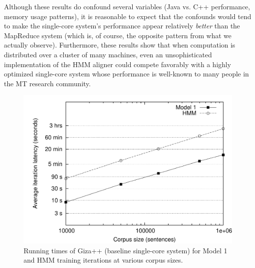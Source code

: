 Although these results do confound several variables (Java vs. C++
performance, memory usage patterns), it is reasonable to expect that
the confounds would tend to make the single-core system's performance
appear relatively \emph{better} than the MapReduce system (which is,
of course, the opposite pattern from what we actually observe).
Furthermore, these results show that when computation is distributed
over a cluster of many machines, even an unsophisticated
implementation of the HMM aligner could compete favorably with a
highly optimized single-core system whose performance is well-known to
many people in the MT research community.

\begin{figure}[p]
\begin{center}
\includegraphics[scale=0.6]{figures/fig-ch6-GIZA-timing.pdf}
\end{center}\caption{Running times of Giza++ (baseline single-core system) for Model 1 and HMM training iterations at various corpus sizes.}\label{chapter6_figure_giza_timing}
\end{figure}

